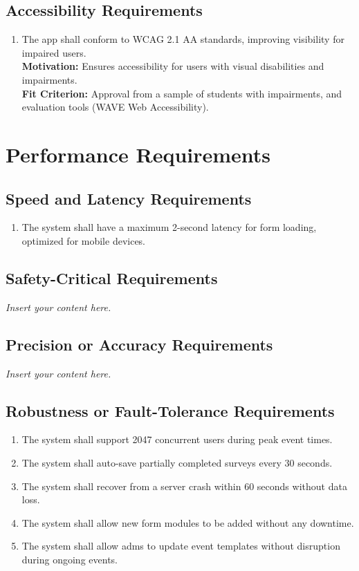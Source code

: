 \documentclass[12pt]{article}
\newcommand{\lips}{\textit{Insert your content here.}}
\begin{document}
\subsection{Accessibility Requirements}
\begin{enumerate}[label=UHR-AR.\arabic*, wide=0pt, leftmargin=*]
  \item The app shall conform to WCAG 2.1 AA standards, improving visibility for impaired users.\\[2mm]
    {\bf Motivation:} Ensures accessibility for users with visual disabilities and impairments.\\
    {\bf Fit Criterion:} Approval from a sample of students with impairments, and evaluation tools (WAVE Web Accessibility).
\end{enumerate}

\section{Performance Requirements}
\subsection{Speed and Latency Requirements}
\begin{enumerate}[align=left,
  leftmargin=*,
  labelsep=1em,
  itemindent=0em,
  label=\bfseries SL-\arabic*:]
  \item The system shall have a maximum 2-second latency for form loading, optimized for
    mobile devices.
\end{enumerate}
\subsection{Safety-Critical Requirements}
\lips
\subsection{Precision or Accuracy Requirements}
\lips
\subsection{Robustness or Fault-Tolerance Requirements}
\begin{enumerate}[align=left,
  leftmargin=*,
  labelsep=1em,
  itemindent=0em,
  label=\bfseries RF-\arabic*:]
  \item The system shall support 2047 concurrent users during peak event times.
  \item The system shall auto-save partially completed surveys every 30 seconds.
  \item The system shall recover from a server crash within 60 seconds without data loss.
  \item The system shall allow new form modules to be added without any downtime.
  \item The system shall allow \glspl{adm} to update event templates without disruption
    during ongoing events.
\end{enumerate}
\end{document}
